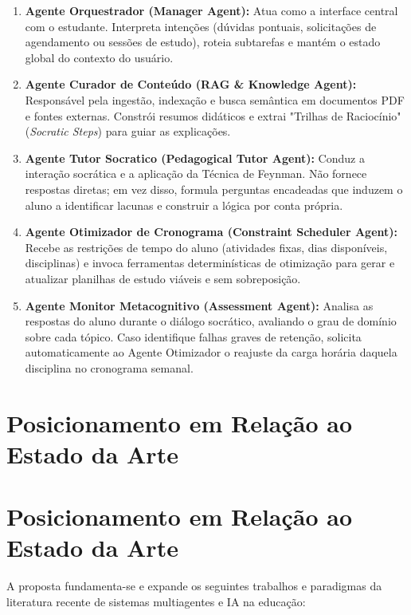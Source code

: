 \documentclass[12pt]{article}
\begin{document}
\begin{enumerate}
\item \textbf{Agente Orquestrador (Manager Agent):} Atua como a interface central com o estudante. Interpreta intenções (dúvidas pontuais, solicitações de agendamento ou sessões de estudo), roteia subtarefas e mantém o estado global do contexto do usuário.
\item \textbf{Agente Curador de Conteúdo (RAG \& Knowledge Agent):} Responsável pela ingestão, indexação e busca semântica em documentos PDF e fontes externas. Constrói resumos didáticos e extrai "Trilhas de Raciocínio" (\textit{Socratic Steps}) para guiar as explicações.
\item \textbf{Agente Tutor Socratico (Pedagogical Tutor Agent):} Conduz a interação socrática e a aplicação da Técnica de Feynman. Não fornece respostas diretas; em vez disso, formula perguntas encadeadas que induzem o aluno a identificar lacunas e construir a lógica por conta própria.
\item \textbf{Agente Otimizador de Cronograma (Constraint Scheduler Agent):} Recebe as restrições de tempo do aluno (atividades fixas, dias disponíveis, disciplinas) e invoca ferramentas determinísticas de otimização para gerar e atualizar planilhas de estudo viáveis e sem sobreposição.
\item \textbf{Agente Monitor Metacognitivo (Assessment Agent):} Analisa as respostas do aluno durante o diálogo socrático, avaliando o grau de domínio sobre cada tópico. Caso identifique falhas graves de retenção, solicita automaticamente ao Agente Otimizador o reajuste da carga horária daquela disciplina no cronograma semanal.
\end{enumerate}
\section{Posicionamento em Relação ao Estado da Arte}
\label{sec:estado_da_arte}
\section{Posicionamento em Relação ao Estado da Arte}

A proposta fundamenta-se e expande os seguintes trabalhos e paradigmas da literatura recente de sistemas multiagentes e IA na educação:
\end{document}
